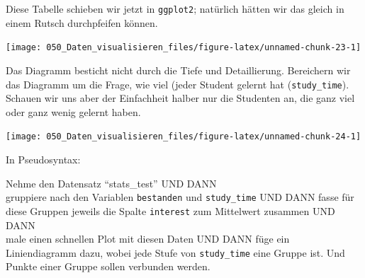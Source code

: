 \documentclass[12pt,ngerman,]{book}
\makeatletter
\newenvironment{Shaded}{\begin{snugshade}}{\end{snugshade}}
\newcommand{\KeywordTok}[1]{\textcolor[rgb]{0.13,0.29,0.53}{\textbf{#1}}}
\newcommand{\DataTypeTok}[1]{\textcolor[rgb]{0.13,0.29,0.53}{#1}}
\newcommand{\StringTok}[1]{\textcolor[rgb]{0.31,0.60,0.02}{#1}}
\newcommand{\OtherTok}[1]{\textcolor[rgb]{0.56,0.35,0.01}{#1}}
\newcommand{\OperatorTok}[1]{\textcolor[rgb]{0.81,0.36,0.00}{\textbf{#1}}}
\newcommand{\NormalTok}[1]{#1}
\newenvironment{kframe}{%
\medskip{}
\setlength{\fboxsep}{.8em}
 \def\at@end@of@kframe{}%
 \ifinner\ifhmode%
  \def\at@end@of@kframe{\end{minipage}}%
  \begin{minipage}{\columnwidth}%
 \fi\fi%
 \def\FrameCommand##1{\hskip\@totalleftmargin \hskip-\fboxsep
 \colorbox{shadecolor}{##1}\hskip-\fboxsep
     \hskip-\linewidth \hskip-\@totalleftmargin \hskip\columnwidth}%
 \MakeFramed {\advance\hsize-\width
   \@totalleftmargin\z@ \linewidth\hsize
   \@setminipage}}%
 {\par\unskip\endMakeFramed%
 \at@end@of@kframe}
\renewenvironment{Shaded}{\begin{kframe}}{\end{kframe}}
\theoremstyle{definition}
\theoremstyle{definition}
\theoremstyle{remark}
\let\BeginKnitrBlock\begin \let\EndKnitrBlock\end
\makeatother
\begin{document}
Diese Tabelle schieben wir jetzt in \texttt{ggplot2}; natürlich hätten
wir das gleich in einem Rutsch durchpfeifen können.

\begin{Shaded}
\end{Shaded}

\begin{center}\texttt{[image: 050\_Daten\_visualisieren\_files/figure-latex/unnamed-chunk-23-1]} \end{center}

Das Diagramm besticht nicht durch die Tiefe und Detaillierung.
Bereichern wir das Diagramm um die Frage, wie viel (jeder Student
gelernt hat (\texttt{study\_time}). Schauen wir uns aber der Einfachheit
halber nur die Studenten an, die ganz viel oder ganz wenig gelernt
haben.

\begin{Shaded}
\end{Shaded}

\begin{center}\texttt{[image: 050\_Daten\_visualisieren\_files/figure-latex/unnamed-chunk-24-1]} \end{center}

In Pseudosyntax:

\BeginKnitrBlock{rmdpseudocode}
Nehme den Datensatz ``stats\_test'' UND DANN\\
gruppiere nach den Variablen \texttt{bestanden} und \texttt{study\_time}
UND DANN fasse für diese Gruppen jeweils die Spalte \texttt{interest}
zum Mittelwert zusammen UND DANN\\
male einen schnellen Plot mit diesen Daten UND DANN füge ein
Liniendiagramm dazu, wobei jede Stufe von \texttt{study\_time} eine
Gruppe ist. Und Punkte einer Gruppe sollen verbunden werden.
\EndKnitrBlock{rmdpseudocode}
\end{document}
